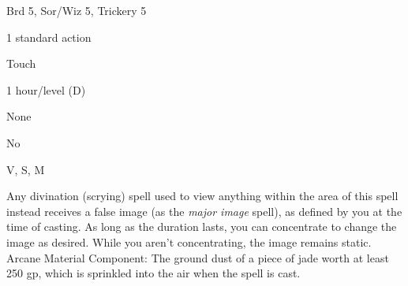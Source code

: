 
\begin{description*}
\item[Level:] Brd 5, Sor/Wiz 5, Trickery 5
\item[Casting Time:] 1 standard action
\item[Range:] Touch
\item[Duration:] 1 hour/level (D)
\item[Saving Throw:] None
\item[Spell Resistance:] No
\item[Components:] V, S, M
\end{description*}

Any divination (scrying) spell used to view anything within the area of this spell
instead receives a false image (as the \textit{major image} spell), as defined
by you at the time of casting. As long as the duration lasts, you can concentrate
to change the image as desired. While you aren't concentrating, the image remains
static.
Arcane Material Component: The ground dust of a piece of jade worth at
least 250 gp, which is sprinkled into the air when the spell is cast.